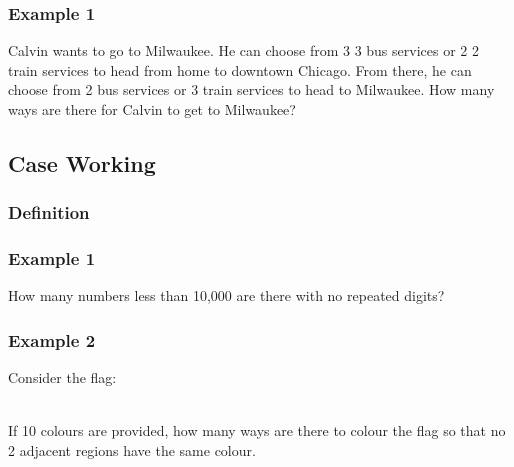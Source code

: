 \documentclass{article}
\begin{document}
\vspace{20px}
\pagebreak
\subsubsection{Example 1}
Calvin wants to go to Milwaukee. He can choose from 3 3 bus services or 2 2
train services to head from home to downtown Chicago. From there, he can choose
from 2 bus services or 3 train services to head to Milwaukee. How many ways are
there for Calvin to get to Milwaukee?
\vspace{30px}



\subsection{Case Working}
\subsubsection{Definition}
\vspace{20px}
\subsubsection{Example 1}
How many numbers less than 10,000 are there with no repeated digits?
\vspace{20px}

\subsubsection{Example 2}
Consider the flag:



\\
If 10 colours are provided, how many ways are there to colour the flag so that no 2 adjacent regions have the same colour.
\vspace{20px}
\end{document}
